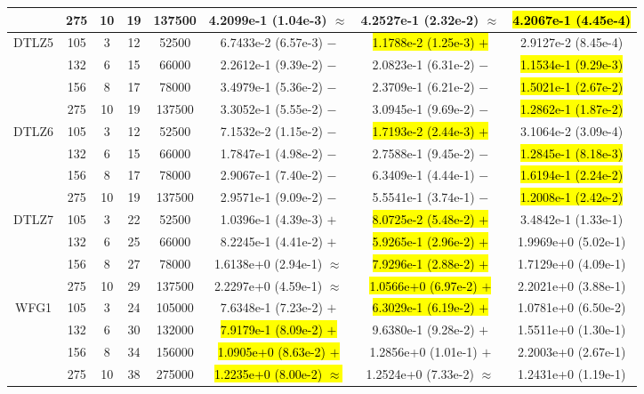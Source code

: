 \documentclass[journal]{IEEEtran}
\begin{document}
\begin{table*}[htbp]
\begin{tabular}{cccccccc}
            &275&10&19&137500&4.2099e-1 (1.04e-3) $\approx$&4.2527e-1 (2.32e-2) $\approx$&\hl{4.2067e-1 (4.45e-4)}\\
            \hline
            \multirow{4}{*}{DTLZ5}&105&3&12&52500&6.7433e-2 (6.57e-3) $-$&\hl{1.1788e-2 (1.25e-3) $+$}&2.9127e-2 (8.45e-4)\\
            &132&6&15&66000&2.2612e-1 (9.39e-2) $-$&2.0823e-1 (6.31e-2) $-$&\hl{1.1534e-1 (9.29e-3)}\\
            &156&8&17&78000&3.4979e-1 (5.36e-2) $-$&2.3709e-1 (6.21e-2) $-$&\hl{1.5021e-1 (2.67e-2)}\\
            &275&10&19&137500&3.3052e-1 (5.55e-2) $-$&3.0945e-1 (9.69e-2) $-$&\hl{1.2862e-1 (1.87e-2)}\\
            \hline
            \multirow{4}{*}{DTLZ6}&105&3&12&52500&7.1532e-2 (1.15e-2) $-$&\hl{1.7193e-2 (2.44e-3) $+$}&3.1064e-2 (3.09e-4)\\
            &132&6&15&66000&1.7847e-1 (4.98e-2) $-$&2.7588e-1 (9.45e-2) $-$&\hl{1.2845e-1 (8.18e-3)}\\
            &156&8&17&78000&2.9067e-1 (7.40e-2) $-$&6.3409e-1 (4.44e-1) $-$&\hl{1.6194e-1 (2.24e-2)}\\
            &275&10&19&137500&2.9571e-1 (9.09e-2) $-$&5.5541e-1 (3.74e-1) $-$&\hl{1.2008e-1 (2.42e-2)}\\
            \hline
            \multirow{4}{*}{DTLZ7}&105&3&22&52500&1.0396e-1 (4.39e-3) $+$&\hl{8.0725e-2 (5.48e-2) $+$}&3.4842e-1 (1.33e-1)\\
            &132&6&25&66000&8.2245e-1 (4.41e-2) $+$&\hl{5.9265e-1 (2.96e-2) $+$}&1.9969e+0 (5.02e-1)\\
            &156&8&27&78000&1.6138e+0 (2.94e-1) $\approx$&\hl{7.9296e-1 (2.88e-2) $+$}&1.7129e+0 (4.09e-1)\\
            &275&10&29&137500&2.2297e+0 (4.59e-1) $\approx$&\hl{1.0566e+0 (6.97e-2) $+$}&2.2021e+0 (3.88e-1)\\
            \hline
            \multirow{4}{*}{WFG1}&105&3&24&105000&7.6348e-1 (7.23e-2) $+$&\hl{6.3029e-1 (6.19e-2) $+$}&1.0781e+0 (6.50e-2)\\
            &132&6&30&132000&\hl{7.9179e-1 (8.09e-2) $+$}&9.6380e-1 (9.28e-2) $+$&1.5511e+0 (1.30e-1)\\
            &156&8&34&156000&\hl{1.0905e+0 (8.63e-2) $+$}&1.2856e+0 (1.01e-1) $+$&2.2003e+0 (2.67e-1)\\
            &275&10&38&275000&\hl{1.2235e+0 (8.00e-2) $\approx$}&1.2524e+0 (7.33e-2) $\approx$&1.2431e+0 (1.19e-1)\\

\end{tabular}
\end{table*}
\end{document}

